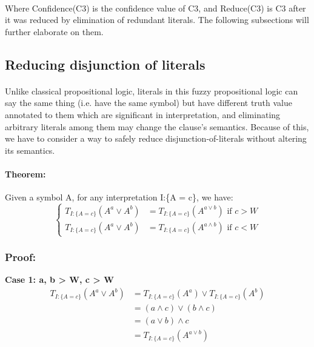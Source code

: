 \documentclass[part1.tex]{subfiles}
\begin{document}
\paragraph{} Where Confidence(C3) is the confidence value of
C3, and Reduce(C3) is C3 after it was reduced by elimination of
redundant literals. The following subsections will further
elaborate on them.

\subsection{Reducing disjunction of literals}
\paragraph{} Unlike classical propositional logic,
literals in this fuzzy propositional logic can say the same thing
(i.e. have the same symbol) but have different truth value
annotated to them which are significant in interpretation, and
eliminating arbitrary literals among them may change the clause's
semantics. Because of this, we have to consider a way to safely
reduce disjunction-of-literals without altering its semantics.
\paragraph{Theorem:} Given a symbol A, for any interpretation
I:\{A = c\}, we have:
\[
   \begin{cases}
           T_{I:\{A = c\}}(A^{a} \vee A^{b}) &=  T_{I:\{A =
           c\}}(A^{a \vee b})  \text{ if } c > W \\

           T_{I:\{A = c\}}(A^{a} \vee A^{b}) &=  T_{I:\{A =
           c\}}(A^{a \wedge b}) \text{ if } c < W
   \end{cases}
\]

\subsubsection{Proof:}
{\bfseries Case 1: a, b > W, c > W}
\begin{align*}
        T_{I:\{A = c\}}(A^{a} \vee A^{b}) &= T_{I:\{A =
                 c\}}(A^{a}) \vee T_{I:\{A = c\}}(A^{b}) \\
                 &= (a \wedge c) \vee (b \wedge c) \\
                 &= (a \vee b) \wedge c \\
                 &= T_{I:\{A = c\}}(A^{a \vee b}) \\
\end{align*}
\end{document}
